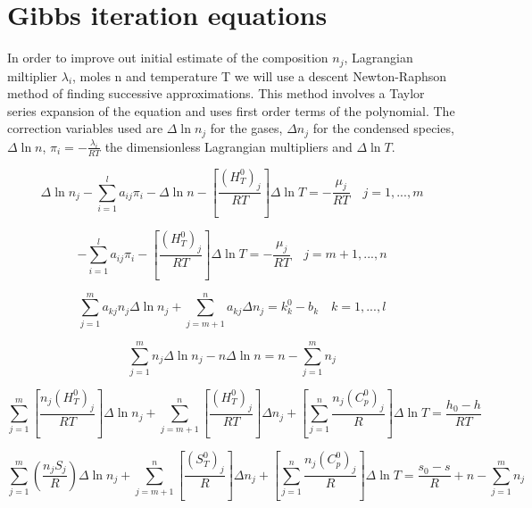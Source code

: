 \documentclass[10pt]{article}
\begin{document}
\section{Gibbs iteration equations}

In order to improve out initial estimate of the composition $n_j$, Lagrangian miltiplier $\lambda_i$, moles n and temperature T we will use a descent Newton-Raphson method of finding successive approximations.  This method involves a Taylor
series expansion of the equation and uses first order terms of the polynomial.  The correction variables used are $\Delta \ln{n_j}$ for the gases,
$\Delta n_j$ for the condensed species, $\Delta \ln{n}$, $\pi_i =
-\frac{\lambda_i}{RT}$ the dimensionless Lagrangian multipliers and
$\Delta \ln{T}$.


\begin{equation}
\Delta \ln{n_j} - \sum_{i=1}^{l}{a_{ij}\pi_i} - \Delta \ln{n} - \left[ \frac{(H_T^0)_j}{RT}\right]\Delta \ln{T} = -\frac{\mu_j}{RT} \quad j = 1,...,m
\label{deltalnnj}
\end{equation}

\begin{equation}
-\sum_{i=1}^{l}{a_{ij}\pi_i}-\left[\frac{(H_T^0)_j}{RT}\right]\Delta \ln{T} = -\frac{\mu_j}{RT} \quad j = m+1,...,n
\end{equation}

\begin{equation}
\sum_{j=1}^{m}{a_{kj}n_j}\Delta\ln{n_j} + \sum_{j=m+1}^{n}{a_{kj}}\Delta n_j = k_k^0 - b_k \quad k = 1,...,l
\label{first}
\end{equation}

\begin{equation}
\sum_{j=1}^{m}{n_j}\Delta \ln{n_j} - n\Delta \ln{n} =n-\sum_{j=1}^{m}{n_j}
\end{equation}

\begin{equation}
\sum_{j=1}^{m}
{\left[\frac{n_j(H_T^0)_j}{RT}\right]}\Delta
\ln{n_j}+\sum_{j=m+1}^{n}{\left[\frac{(H_T^0)_j}{RT}\right]}\Delta{n_j}+\left[\sum_{j=1}^{n}{\frac{n_j(C_p^0)_j}{R}}\right]\Delta
\ln{T}=\frac{h_0-h}{RT}
\end{equation}

\begin{equation}
\sum_{j=1}^{m}
{\left(\frac{n_jS_j}{R}\right)}\Delta
\ln{n_j}+\sum_{j=m+1}^{n}{\left[\frac{(S_T^0)_j}{R}\right]}\Delta{n_j}+\left[\sum_{j=1}^{n}{\frac{n_j(C_p^0)_j}{R}}\right]\Delta
\ln{T}=\frac{s_0-s}{R}+n-\sum_{j=1}^{m}{n_j}
\label{last}
\end{equation}
\end{document}
